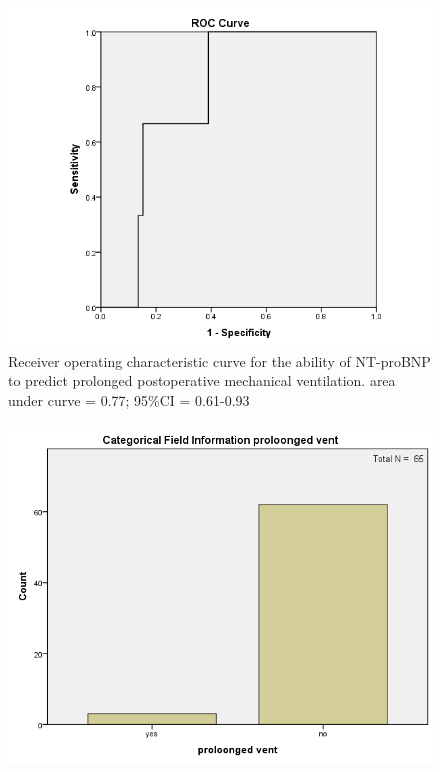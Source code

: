 \documentclass[14pt,a4paper,onecolumn]{extarticle}
\begin{document}
\clearpage
\begin{figure}
    \centering
    \includegraphics[scale=0.7]{./images/roc_vent.png}
    \caption{Receiver operating characteristic curve for the ability of NT-proBNP to predict prolonged postoperative mechanical ventilation.  area under curve = 0.77; 95\%CI = 0.61-0.93}
    \label{}
\end{figure}

\clearpage
\begin{figure}
    \centering
    \includegraphics[scale=0.7]{./images/cat_vent.png}
    \caption{}
    \label{}
\end{figure}
\end{document}
